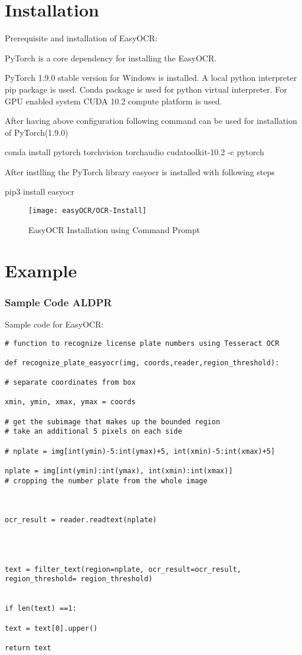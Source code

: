 \section{Installation}

Prerequisite and installation of EasyOCR:

PyTorch is a core dependency for installing the EasyOCR. 

PyTorch 1.9.0 stable version for Windows is installed. A local python interpreter pip package is used. Conda package is used for python virtual interpreter. For GPU enabled system CUDA 10.2 compute platform is used.

After having above configuration following command can be used for installation of PyTorch(1.9.0)

conda install pytorch torchvision torchaudio cudatoolkit-10.2 -c pytorch

After instlling the PyTorch library easyocr is installed with following steps

pip3 install easyocr

\begin{figure}[h!]
	\centering
	\texttt{[image: easyOCR/OCR-Install]}
	\caption{EasyOCR Installation using Command Prompt}
\end{figure}

\section{Example}

\subsubsection{Sample Code ALDPR}

Sample code for EasyOCR:

\begin{lstlisting}
# function to recognize license plate numbers using Tesseract OCR
	
def recognize_plate_easyocr(img, coords,reader,region_threshold):
	
# separate coordinates from box
	
xmin, ymin, xmax, ymax = coords
	
# get the subimage that makes up the bounded region
# take an additional 5 pixels on each side
	
# nplate = img[int(ymin)-5:int(ymax)+5, int(xmin)-5:int(xmax)+5]
	
nplate = img[int(ymin):int(ymax), int(xmin):int(xmax)] 
# cropping the number plate from the whole image
	
	
	
ocr_result = reader.readtext(nplate)
	
	
	
	
text = filter_text(region=nplate, ocr_result=ocr_result,
region_threshold= region_threshold)
	
	
if len(text) ==1:
	
text = text[0].upper()
	
return text
\end{lstlisting}

